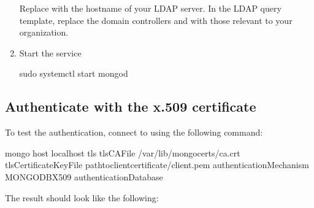 \documentclass[letterpaper,10pt,english]{sphinxmanual}
\begin{document}
\begin{enumerate}
\sphinxAtStartPar
Replace  with the hostname of your LDAP server. In the LDAP query template, replace the domain controllers  and  with those relevant to your organization.

\item {} 
\sphinxAtStartPar
Start the  service

\begin{sphinxVerbatim}[commandchars=\\\{\}]
\PYGZdl{} sudo systemctl start mongod
\end{sphinxVerbatim}

\end{enumerate}


\subsection{Authenticate with the x.509 certificate}
\label{\detokenize{x509-ldap:authenticate-with-the-x-509-certificate}}
\sphinxAtStartPar
To test the authentication, connect to  using the following command:

\begin{sphinxVerbatim}[commandchars=\\\{\}]
\PYGZdl{} mongo \PYGZhy{}\PYGZhy{}host localhost \PYGZhy{}\PYGZhy{}tls \PYGZhy{}\PYGZhy{}tlsCAFile /var/lib/mongocerts/ca.crt \PYGZhy{}\PYGZhy{}tlsCertificateKeyFile \PYGZlt{}path\PYGZus{}to\PYGZus{}client\PYGZus{}certificate\PYGZgt{}/client.pem  \PYGZhy{}\PYGZhy{}authenticationMechanism MONGODB\PYGZhy{}X509 \PYGZhy{}\PYGZhy{}authenticationDatabase
\end{sphinxVerbatim}

\sphinxAtStartPar
The result should look like the following:
\end{document}
